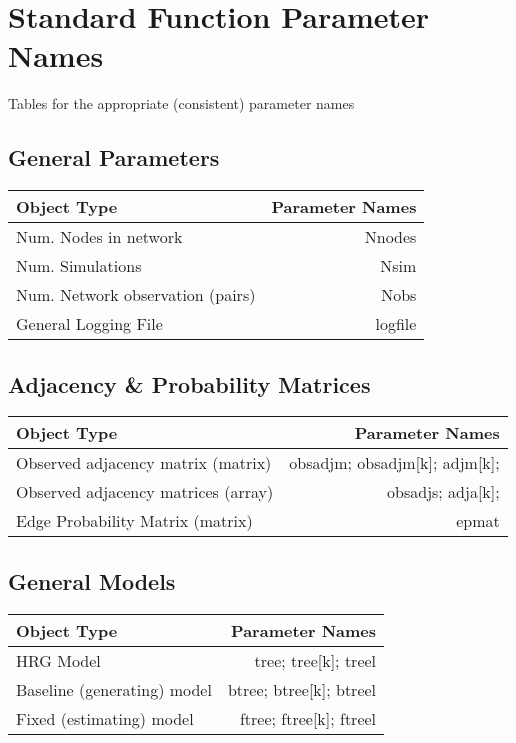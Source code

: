 \documentclass[11pt]{article}
\begin{document}
\section{Standard Function Parameter Names}
Tables for the appropriate (consistent) parameter names









\subsection{General Parameters}
\begin{tabular}{|l|r|}
\hline
{\bf Object Type} & {\bf Parameter Names} \\


\hline
Num. Nodes in network & Nnodes \\

\hline
Num. Simulations & Nsim \\

\hline
Num. Network observation (pairs) & Nobs \\

\hline 
General Logging File	 & logfile \\

\hline
\end{tabular}



\subsection{Adjacency \& Probability Matrices}
\begin{tabular}{|l|r|}
\hline
{\bf Object Type} & {\bf Parameter Names} \\


\hline
Observed adjacency matrix (matrix) & obsadjm; obsadjm[k]; adjm[k];\\

\hline 
Observed adjacency matrices (array) & obsadjs; adja[k]; \\

\hline
Edge Probability Matrix (matrix) & epmat \\

\hline
\end{tabular}

\subsection{General Models}
\begin{tabular}{|l|r|}
\hline
{\bf Object Type} & {\bf Parameter Names} \\


\hline
HRG Model & tree; tree[k]; treel \\
\hline
Baseline (generating) model & btree; btree[k]; btreel \\
\hline
Fixed (estimating) model & ftree; ftree[k]; ftreel \\

\hline
\end{tabular}
\end{document}

